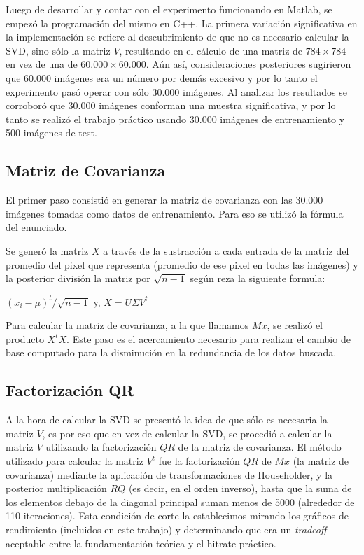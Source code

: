 Luego de desarrollar y contar con el experimento funcionando en Matlab, se empez\'o la programaci\'on
del mismo en C++. La primera variaci\'on significativa en la implementaci\'on se refiere al
descubrimiento de que no es necesario calcular la SVD, sino s\'olo la matriz $V$, resultando
en el c\'alculo de una matriz de $784 \times 784$ en vez de una de $60.000 \times 60.000$.
A\'un as\'i, consideraciones posteriores sugirieron que 60.000 im\'agenes era un n\'umero por
dem\'as excesivo y por lo tanto el experimento pas\'o operar con s\'olo 30.000 im\'agenes.
Al analizar los resultados se corrobor\'o que 30.000 im\'agenes conforman una muestra significativa,
y por lo tanto se realiz\'o el trabajo pr\'actico usando 30.000 im\'agenes de entrenamiento y 500 im\'agenes de test.

\subsection{Matriz de Covarianza}

El primer paso consisti\'o en generar la matriz de covarianza con las 30.000
im\'agenes tomadas como datos de entrenamiento. Para eso se utiliz\'o la f\'ormula del enunciado.

Se gener\'o la matriz $X$ a trav\'es de la sustracci\'on a cada entrada de la
matriz del promedio del pixel que representa (promedio de ese pixel en todas las
im\'agenes) y la posterior divisi\'on la matriz por $\sqrt{n-1}$ seg\'un reza la
siguiente formula:
\\

\centerline{$(x_i - \mu)^{t}/\sqrt{n-1}$ y, $X=U \Sigma V^t$}
\bigskip
Para calcular la matriz de covarianza, a la que llamamos $Mx$, se realiz\'o el
producto $X^tX$. Este paso es el acercamiento necesario para realizar el cambio
de base computado para la disminuci\'on en la redundancia de los datos buscada.

\subsection{Factorizaci\'on QR}
A la hora de calcular la SVD se present\'o la idea de que s\'olo es necesaria la matriz $V$, es por
eso que en vez de calcular la SVD, se procedi\'o a calcular la matriz $V$ utilizando la factorizaci\'on
$QR$ de la matriz de covarianza. El m\'etodo utilizado para calcular la matriz $V^t$ fue la factorizaci\'on
$QR$ de $Mx$ (la matriz de covarianza) mediante la aplicaci\'on de transformaciones de Householder, y la
posterior multiplicaci\'on $RQ$ (es decir, en el orden inverso), hasta que la suma de los elementos debajo
de la diagonal principal suman menos de 5000 (alrededor de 110 iteraciones). Esta condici\'on de corte la establecimos mirando
los gr\'aficos de rendimiento (incluidos en este trabajo) y determinando que era un \textit{tradeoff}
aceptable entre la fundamentaci\'on te\'orica y el hitrate pr\'actico. 

